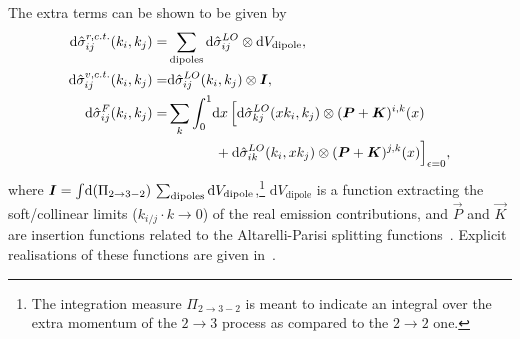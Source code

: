 \documentclass[../main.tex]{subfiles}
\begin{document}
The extra terms can be shown to be given by
\begin{subequations}
  \begin{align}
    \mathrm{d}\hat\sigma_{ij}^{r, c.t.}(k_i,k_j) = & \sum_{\text{dipoles}} \mathrm{d}\hat\sigma_{ij}^{LO} \otimes \mathrm{d}V_{\text{dipole}},                        \\
    \mathrm{d}\hat\sigma_{ij}^{v, c.t.}(k_i,k_j) = & \mathrm{d}\hat\sigma_{ij}^{LO}(k_i,k_j) \otimes \vec{I},                                                         \\
    \nonumber
    \mathrm{d}\hat\sigma_{ij}^{F}(k_i, k_j) =      & \sum_{k}\integral[_0^1]{x} \Bigl[\mathrm{d}\hat\sigma_{k j}^{LO}(xk_i,k_j) \otimes (\vec{P}+\vec{K})^{i,k}(x)    \\
                                                   & \hspace{1.2cm} + \mathrm{d}\hat\sigma^{LO}_{ik}(k_i,xk_j) \otimes (\vec{P}+\vec{K})^{j,k}(x)\Bigr]_{\epsilon=0},
  \end{align}
\end{subequations}
where \(\vec{I} = \integral{(\Pi_{2 \to 3-2})} \sum_{\text{dipoles}} \mathrm{d}V_{\text{dipole}}\),\footnote{The integration measure \(\Pi_{2\to 3-2}\) is meant to indicate an integral over the extra momentum of the \(2 \to 3\) process as compared to the \(2 \to 2\) one.} \(\mathrm{d}V_{\text{dipole}}\) is a function extracting the soft/collinear limits (\(k_{i/j} \cdot k \to 0\)) of the real emission contributions, and \(\vec{P}\) and \(\vec{K}\) are insertion functions related to the Altarelli-Parisi splitting functions~\cite{Altarelli:1977zs}.
Explicit realisations of these functions are given in~\cite{Catani:1996vz}.
\end{document}
